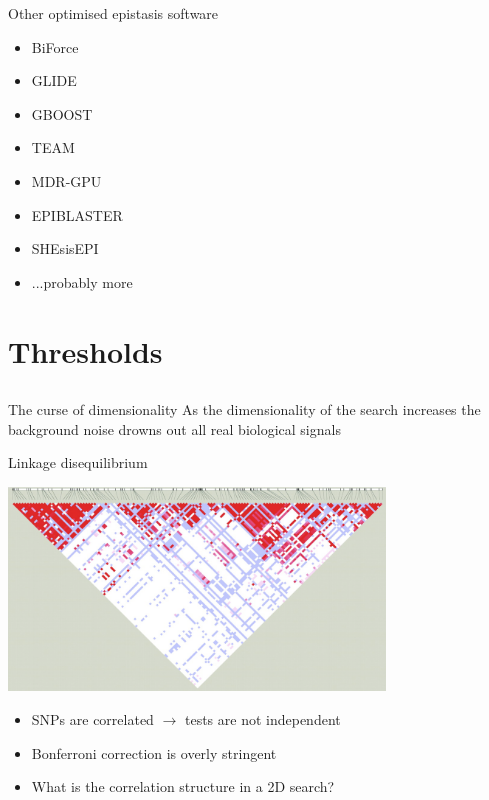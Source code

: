 \documentclass{beamer}
\begin{document}
\begin{frame}{Other optimised epistasis software}
\begin{itemize}
\item BiForce
\item GLIDE
\item GBOOST
\item TEAM
\item MDR-GPU
\item EPIBLASTER
\item SHEsisEPI
\item ...probably more
\end{itemize}
\end{frame}


\section{Thresholds}
\subsection{}

\begin{frame}{The curse of dimensionality}
As the dimensionality of the search increases the background noise drowns out all real biological signals
\end{frame}

\begin{frame}{Linkage disequilibrium}
\begin{center}
\includegraphics[width=10cm]{ld.png}
\end{center}
\begin{itemize}
\item SNPs are correlated $\rightarrow$ tests are not independent
\item Bonferroni correction is overly stringent
\item What is the correlation structure in a 2D search?
\end{itemize}
\end{frame}
\end{document}
